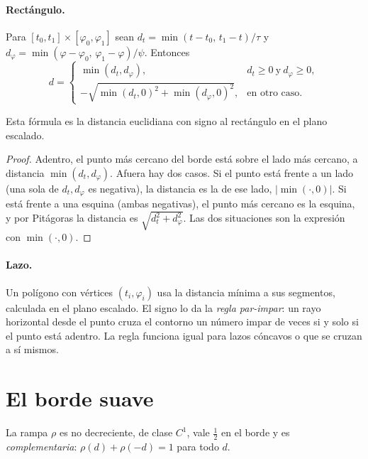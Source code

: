 \paragraph{Rectángulo.} Para $[t_0,t_1]\times[\varphi_0,\varphi_1]$ sean
$d_t=\min(t-t_0,\,t_1-t)/\tau$ y $d_\varphi=\min(\varphi-\varphi_0,\,\varphi_1-\varphi)/\psi$. Entonces
\[
  d=\begin{cases}\min(d_t,d_\varphi), & d_t\ge0\ \text{y}\ d_\varphi\ge0,\\[2pt]
  -\sqrt{\min(d_t,0)^2+\min(d_\varphi,0)^2}, & \text{en otro caso.}\end{cases}
\]

\begin{proposicion}
Esta fórmula es la distancia euclidiana con signo al rectángulo en el plano escalado.
\end{proposicion}

\begin{proof}
Adentro, el punto más cercano del borde está sobre el lado más cercano, a distancia
$\min(d_t,d_\varphi)$. Afuera hay dos casos. Si el punto está frente a un lado (una sola de
$d_t,d_\varphi$ es negativa), la distancia es la de ese lado, $|\min(\cdot,0)|$. Si está frente a una
esquina (ambas negativas), el punto más cercano es la esquina, y por Pitágoras la distancia es
$\sqrt{d_t^2+d_\varphi^2}$. Las dos situaciones son la expresión con $\min(\cdot,0)$.
\end{proof}

\paragraph{Lazo.} Un polígono con vértices $(t_i,\varphi_i)$ usa la distancia mínima a sus segmentos,
calculada en el plano escalado. El signo lo da la \emph{regla par-impar}: un rayo horizontal desde
el punto cruza el contorno un número impar de veces si y solo si el punto está adentro. La regla
funciona igual para lazos cóncavos o que se cruzan a sí mismos.

\section{El borde suave}

\begin{proposicion}\label{prop:rampa}
La rampa $\rho$ es no decreciente, de clase $C^1$, vale $\tfrac12$ en el borde y es
\emph{complementaria}: $\rho(d)+\rho(-d)=1$ para todo $d$.
\end{proposicion}

